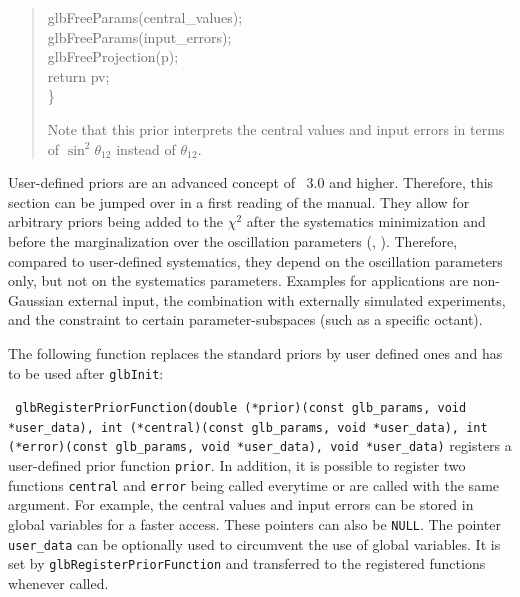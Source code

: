 {\begin{quote}
{{  \hspace*{0.5cm} glbFreeParams(central\_values); \\
  \hspace*{0.5cm} glbFreeParams(input\_errors); \\
  \hspace*{0.5cm} glbFreeProjection(p); \\
  \hspace*{0.5cm} return pv; \\
\}
}
}

Note that this prior interprets the central values and input errors in terms of  $\sin^2 \theta_{12}$
instead of $\theta_{12}$.
\end{quote}
}

User-defined priors are an advanced concept of \GLOBES\ 3.0 and higher. Therefore,
this section can be jumped over in a first reading of the manual.
They allow for arbitrary priors being added to the $\chi^2$ after the systematics
minimization and before the marginalization over the oscillation parameters (\cf, ).
Therefore, compared to user-defined systematics, they depend on the oscillation
parameters only, but not on the systematics parameters. Examples for applications
are non-Gaussian external input, the combination with externally simulated experiments, and the
constraint to certain parameter-subspaces (such as a specific octant).

The following function replaces the standard priors by user defined ones and has to be used
after {\tt glbInit}:
\begin{function}
{\tt 
glbRegisterPriorFunction(double (*prior)(const glb\_params, void *user\_data), int (*central)(const glb\_params, void *user\_data), int (*error)(const glb\_params, void *user\_data),  void *user\_data)} registers a user-defined prior function {\tt prior}. In addition, it is possible to register
two functions {\tt central} and {\tt error} being called everytime  or  are called with the same argument. For example, the central values and input errors can be stored in
global variables for a faster access. These pointers can also be {\tt NULL}. The pointer {\tt user\_data} can be optionally used to circumvent the use of global variables. It is set by {\tt glbRegisterPriorFunction} and transferred to the registered functions whenever called.
\end{function}

